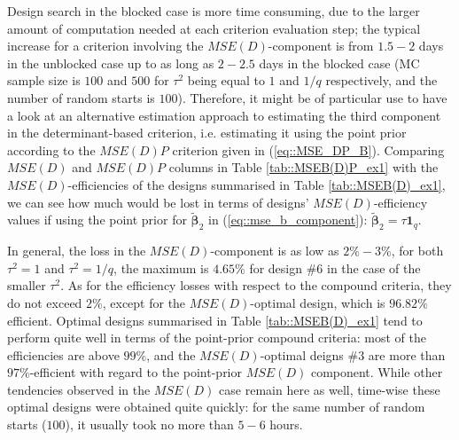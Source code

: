 Design search in the blocked case is more time consuming, due to the larger amount of computation needed at each criterion evaluation step; the typical increase for a criterion involving the $MSE(D)$-component is from $1.5-2$ days in the unblocked case up to as long as $2-2.5$ days in the blocked case (MC sample size is $100$ and $500$ for $\tau^2$ being equal to $1$ and $1/q$ respectively, and the number of random starts is $100$). Therefore, it might be of particular use to have a look at an alternative estimation approach to estimating the third component in the determinant-based criterion, i.e. estimating it using the point prior according to the $MSE(D)P$ criterion given in (\ref{eq::MSE_DP_B}). Comparing $MSE(D)$ and $MSE(D)P$ columns in Table \ref{tab::MSEB(D)P_ex1} with the $MSE(D)$-efficiencies of the designs summarised in Table \ref{tab::MSEB(D)_ex1}, we can see how much would be lost in terms of designs' $MSE(D)$-efficiency values if using the point prior for $\bm{\tilde{\beta}}_2$ in (\ref{eq::mse_b_component}): $\bm{\tilde{\beta}}_2=\tau\bm{1}_q$.

In general, the loss in the $MSE(D)$-component is as low as $2\%-3\%$, for both $\tau^2=1$ and $\tau^2=1/q$, the maximum is $4.65\%$ for design \#$6$ in the case of the smaller $\tau^2$. As for the efficiency losses with respect to the compound criteria, they do not exceed $2\%$, except for the $MSE(D)$-optimal design, which is $96.82\%$ efficient. Optimal designs summarised in Table \ref{tab::MSEB(D)_ex1} tend to perform quite well in terms of the point-prior compound criteria: most of the efficiencies are above $99\%$, and the $MSE(D)$-optimal deigns \#$3$ are more than $97\%$-efficient with regard to the point-prior $MSE(D)$ component. While other tendencies observed in the $MSE(D)$ case remain here as well, time-wise these optimal designs were obtained quite quickly: for the same number of random starts ($100$), it usually took no more than $5-6$ hours. 

